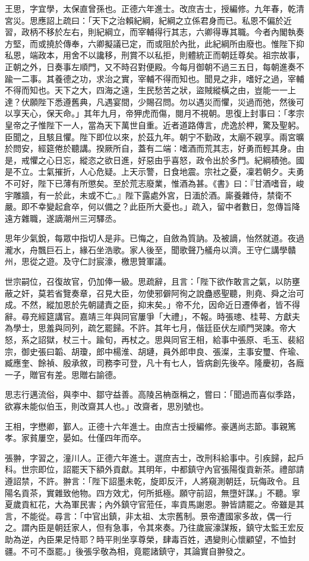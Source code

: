 \begin{pinyinscope}
王思，字宜學，太保直曾孫也。正德六年進士。改庶吉士，授編修。九年春，乾清宮災。思應詔上疏曰：「天下之治賴紀綱，紀綱之立係君身而已。私恩不偏於近習，政柄不移於左右，則紀綱立，而宰輔得行其志，六卿得專其職。今者內閣執奏方堅，而或撓於傳奉，六卿擬議已定，而或阻於內批，此紀綱所由廢也。惟陛下抑私恩，端政本，用舍不以讒移，刑賞不以私拒，則體統正而朝廷尊矣。祖宗故事，正朝之外，日奏事左順門，又不時召對便殿。今每月御朝不過三五日，每朝進奏不踰一二事。其養德之功，求治之實，宰輔不得而知也。聞見之非，嗜好之過，宰輔不得而知也。天下之大，四海之遠，生民愁苦之狀，盜賊縱橫之由，豈能一一上達？伏願陛下悉遵舊典，凡遇宴間，少賜召問。勿以遇災而懼，災過而弛，然後可以享天心，保天命。」其年九月，帝狎虎而傷，閱月不視朝。思復上封事曰：「孝宗皇帝之子惟陛下一人，當為天下萬世自重。近者道路傳言，虎逸於柙，驚及聖躬。臣聞之，且駭且懼。陛下即位以來，於茲九年。朝宁不勤政，太廟不親享。兩宮曠於問安，經筵倦於聽講。揆厥所自，蓋有二端：嗜酒而荒其志，好勇而輕其身。由是，戒懼之心日忘，縱恣之欲日進，好惡由乎喜怒，政令出於多門。紀綱積弛。國是不立。士氣摧折，人心危疑。上天示警，日食地震。宗社之憂，凜若朝夕。夫勇不可好，陛下已薄有所懲矣。至於荒志廢業，惟酒為甚。《書》曰：『甘酒嗜音，峻宇雕牆，有一於此，未或不亡。』陛下露處外宮，日湎於酒。廝養雜侍，禁衛不嚴。即不幸變起倉卒，何以備之？此臣所大憂也。」疏入，留中者數日，忽傳旨降遠方雜職，遂謫潮州三河驛丞。

思年少氣銳，每眾中指切人是非。已悔之，自斂為質訥。及被謫，怡然就道。夜過瀧水，舟飄巨石上，緣石坐浩歌。家人後至，聞歌聲乃艤舟以濟。王守仁講學贛州，思從之遊。及守仁討宸濠，檄思贊軍議。

世宗嗣位，召復故官，仍加俸一級。思疏辭，且言：「陛下欲作敢言之氣，以防壅蔽之奸，莫若省覽奏章，召見大臣，勿使邪僻阿徇之說蠱惑聖聽，則堯、舜之治可成。不然，縱加恩於先朝譴責之臣，抑末矣。」帝不允，因命近日遷俸者，皆不得辭。尋充經筵講官。嘉靖三年與同官屢爭「大禮」，不報。時張璁、桂萼、方獻夫為學士，思羞與同列，疏乞罷歸。不許。其年七月，偕廷臣伏左順門哭諫。帝大怒，系之詔獄，杖三十。踰旬，再杖之。思與同官王相，給事中張原、毛玉、裴紹宗，御史張曰韜、胡瓊，郎中楊淮、胡璉，員外郎申良、張澯，主事安璽、仵瑜、臧應奎、餘禎、殷承敘，司務李可登，凡十有七人，皆病創先後卒。隆慶初，各廕一子，贈官有差。思贈右諭德。

思志行邁流俗，與李中、鄒守益善。高陵呂柟亟稱之，嘗曰：「聞過而喜似季路，欲寡未能似伯玉，則改齋其人也。」改齋者，思別號也。

王相，字懋卿，鄞人。正德十六年進士。由庶吉士授編修。豪邁尚志節。事親篤孝。家貧屢空，晏如。仕僅四年而卒。

張翀，字習之，潼川人。正德六年進士。選庶吉士，改刑科給事中。引疾歸，起戶科。世宗即位，詔罷天下額外貢獻。其明年，中都鎮守內官張陽復貢新茶。禮部請遵詔禁，不許。翀言：「陛下詔墨未乾，旋即反汗，人將窺測朝廷，玩侮政令。且陽名貢茶，實雜致他物。四方效尤，何所抵極。願守前詔，無墮奸謀。」不聽。寧夏歲貢紅花，大為軍民害；內外鎮守官蒞任，率貢馬謝恩。翀皆請罷之。帝雖是其言，不能從。尋言：「中官出鎮，非太祖、太宗舊制。景帝遭國家多故，偶一行之。謂內臣是朝廷家人，但有急事，令其來奏。乃往歲宸濠謀叛，鎮守太監王宏反助為逆，內臣果足恃耶？時平則坐享尊榮，肆毒百姓，遇變則心懷顧望，不恤封疆。不可不亟罷。」後張孚敬為相，竟罷諸鎮守，其論實自翀發之。


\end{pinyinscope}
